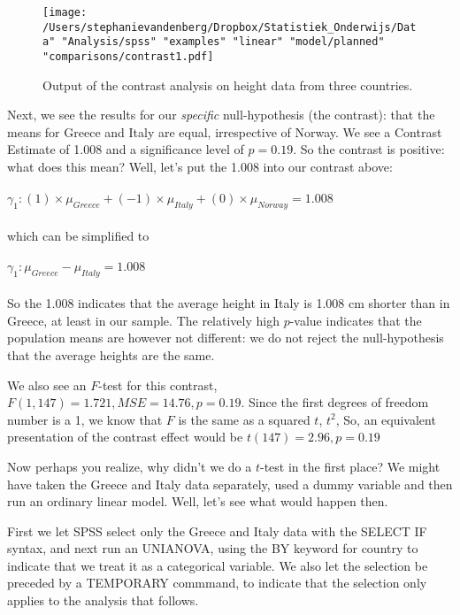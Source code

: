 \begin{figure}[h]
    \begin{center}
       \texttt{[image: /Users/stephanievandenberg/Dropbox/Statistiek\_Onderwijs/Data" "Analysis/spss" "examples" "linear" "model/planned" "comparisons/contrast1.pdf]}
    \end{center}
    \label{fig:contrast1}
    \caption{Output of the contrast analysis on height data from three countries.}
\end{figure}


Next, we see the results for our \textit{specific} null-hypothesis (the contrast): that the means for Greece and Italy are equal, irrespective of Norway. We see a Contrast Estimate of 1.008 and a significance level of $p=0.19$. So the contrast is positive: what does this mean? Well, let's put the 1.008 into our contrast above:
\\
\\
$\gamma_1: (1)\times \mu_{Greece} + (-1) \times \mu_{Italy} + (0) \times \mu_{Norway} = 1.008$
\\
\\
which can be simplified to
\\
\\
$\gamma_1:  \mu_{Greece} - \mu_{Italy}  =  1.008$
\\
\\
So the 1.008 indicates that the average height in Italy is 1.008 cm shorter than in Greece, at least in our sample. The relatively high $p$-value indicates that the population means are however not different: we do not reject the null-hypothesis that the average heights are the same.

We also see an $F$-test for this contrast, $F(1, 147)=1.721, MSE= 14.76, p=0.19$.
Since the first degrees of freedom number is a 1, we know that $F$ is the same as a squared $t$, $t^2$, So, an equivalent presentation of the contrast effect would be $t(147)=2.96, p=0.19$

Now perhaps you realize, why didn't we do a $t$-test in the first place? We might have taken the Greece and Italy data separately, used a dummy variable and then run an ordinary linear model. Well, let's see what would happen then.

First we let SPSS select only the Greece and Italy data with the SELECT IF syntax, and next run an UNIANOVA, using the BY keyword for country to indicate that we treat it as a categorical variable. We also let the selection be preceded by a TEMPORARY commmand, to indicate that the selection only applies to the analysis that follows.

